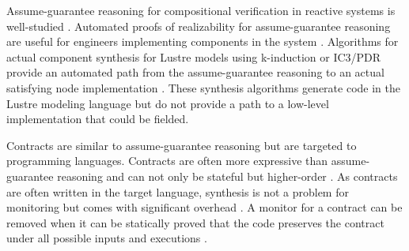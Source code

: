 Assume-guarantee reasoning for compositional verification in reactive systems is well-studied \cite{10.1007/978-3-642-28891-3_13, composition1, 10.1145/2658982.2527272, 10.1007/978-3-319-17524-9_7}. Automated proofs of realizability for assume-guarantee reasoning are useful for engineers implementing components in the system \cite{10.1007/978-3-319-17524-9_13, 10.1007/978-3-319-29613-5_7}. Algorithms for actual component synthesis for Lustre models using k-induction or IC3/PDR provide an automated path from the assume-guarantee reasoning to an actual satisfying node implementation \cite{katis2017synthesis, 10.1007/978-3-319-89963-3_10}. These synthesis algorithms generate code in the Lustre modeling language but do not provide a path to a low-level implementation that could be fielded.

Contracts are similar to assume-guarantee reasoning but are targeted to programming languages. Contracts are often more expressive than assume-guarantee reasoning and can not only be stateful but higher-order \cite{10.1145/583852.581484}. As contracts are often written in the target language, synthesis is not a problem for monitoring but comes with significant overhead \cite{10.1007/978-3-642-28869-2_11}. A monitor for a contract can be removed when it can be statically proved that the code preserves the contract under all possible inputs and executions \cite{10.1145/3158139}.